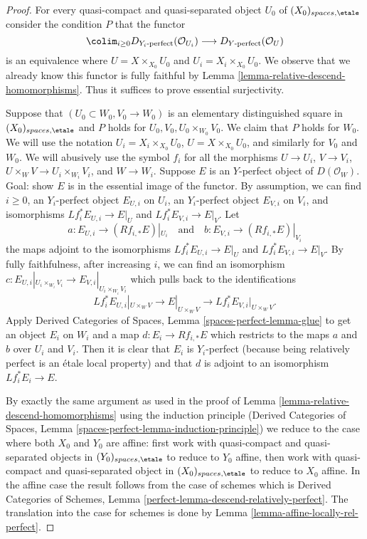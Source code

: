 \begin{proof}
For every quasi-compact and quasi-separated object $U_0$ of
$(X_0)_{spaces, \etale}$ consider the condition $P$
that the functor
$$
\colim_{i \geq 0} D_{Y_i\text{-perfect}}(\mathcal{O}_{U_i})
\longrightarrow
D_{Y\text{-perfect}}(\mathcal{O}_U)
$$
is an equivalence where $U = X \times_{X_0} U_0$ and
$U_i = X_i \times_{X_0} U_0$.
We observe that we already know this functor is fully faithful
by Lemma \ref{lemma-relative-descend-homomorphisms}. Thus it suffices to prove
essential surjectivity.

\medskip\noindent
Suppose that $(U_0 \subset W_0, V_0 \to W_0)$ is an elementary
distinguished square in $(X_0)_{spaces, \etale}$
and $P$ holds for $U_0, V_0, U_0 \times_{W_0} V_0$.
We claim that $P$ holds for $W_0$. We will use the notation
$U_i = X_i \times_{X_0} U_0$, $U = X \times_{X_0} U_0$,
and similarly for $V_0$ and $W_0$. We will abusively use the symbol
$f_i$ for all the morphisms $U \to U_i$, $V \to V_i$,
$U \times_W V \to U_i \times_{W_i} V_i$, and $W \to W_i$.
Suppose $E$ is an $Y$-perfect object of $D(\mathcal{O}_W)$.
Goal: show $E$ is in the essential image of the functor.
By assumption,
we can find $i \geq 0$, an $Y_i$-perfect object $E_{U, i}$ on $U_i$,
an $Y_i$-perfect object $E_{V, i}$ on $V_i$, and
isomorphisms $Lf_i^*E_{U, i} \to E|_U$ and $Lf_i^*E_{V, i} \to E|_V$.
Let
$$
a : E_{U, i} \to (Rf_{i, *}E)|_{U_i}
\quad\text{and}\quad
b : E_{V, i} \to (Rf_{i, *}E)|_{V_i}
$$
the maps adjoint to the isomorphisms $Lf_i^*E_{U, i} \to E|_U$
and $Lf_i^*E_{V, i} \to E|_V$.
By fully faithfulness, after increasing $i$,
we can find an isomorphism
$c : E_{U, i}|_{U_i \times_{W_i} V_i} \to E_{V, i}|_{U_i \times_{W_i} V_i}$
which pulls back to the identifications 
$$
Lf_i^*E_{U, i}|_{U \times_W V} \to E|_{U \times_W V} \to
Lf_i^*E_{V, i}|_{U \times_W V}.
$$
Apply Derived Categories of Spaces, Lemma
\ref{spaces-perfect-lemma-glue}
to get an object $E_i$ on $W_i$ and a map $d : E_i \to Rf_{i, *}E$
which restricts to the maps $a$ and $b$ over $U_i$ and $V_i$.
Then it is clear that $E_i$ is $Y_i$-perfect (because being
relatively perfect is an \'etale local property) and that
$d$ is adjoint to an isomorphism $Lf_i^*E_i \to E$.

\medskip\noindent
By exactly the same argument as used in
the proof of Lemma \ref{lemma-relative-descend-homomorphisms}
using the induction principle
(Derived Categories of Spaces, Lemma
\ref{spaces-perfect-lemma-induction-principle})
we reduce to the case where both $X_0$ and $Y_0$
are affine: first work with quasi-compact and quasi-separated objects
in $(Y_0)_{spaces, \etale}$ to reduce to
$Y_0$ affine, then work with quasi-compact and quasi-separated object
in $(X_0)_{spaces, \etale}$ to reduce to $X_0$ affine.
In the affine case the result follows from the case of schemes which is
Derived Categories of Schemes, Lemma
\ref{perfect-lemma-descend-relatively-perfect}.
The translation into the case for schemes is done by
Lemma \ref{lemma-affine-locally-rel-perfect}.
\end{proof}

